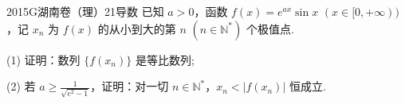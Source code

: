 
\begin{problem}{2015}{G}{湖南卷（理）}{21}{导数}
已知 $a>0$，函数 $f(x)=e^{ax}\sin x$ $(x\in[0,+\infty))$，记 $x_n$ 为 $f(x)$ 的从小到大的第 $n$ $(n\in\mathbb{N}^*)$ 个极值点.

(1) 证明：数列 $\{f(x_n)\}$ 是等比数列;

(2) 若 $a\ge\frac{1}{\sqrt{e^2-1}}$，证明：对一切 $n\in\mathbb{N}^*$，$x_n<|f(x_n)|$ 恒成立.
\end{problem}